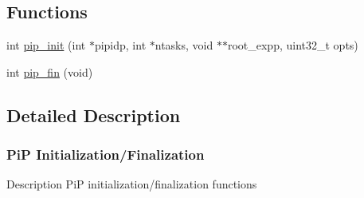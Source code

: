 \documentclass[twoside]{book}
\begin{document}
\subsection*{Functions}
\begin{DoxyCompactItemize}
\item 
int \hyperlink{group__pip-0-init-fin_ga20439326ff318c2dd0752bd544dca0e2}{pip\-\_\-init} (int $\ast$pipidp, int $\ast$ntasks, void $\ast$$\ast$root\-\_\-expp, uint32\-\_\-t opts)
\item 
int \hyperlink{group__pip-0-init-fin_gac4654282785abb9434ce81573fdf16ed}{pip\-\_\-fin} (void)
\end{DoxyCompactItemize}


\subsection{Detailed Description}
\hypertarget{pip-intialize-finalize}{}\subsubsection{Pi\-P Initialization/\-Finalization}\label{pip-intialize-finalize}
\begin{DoxyParagraph}{Description}
Pi\-P initialization/finalization functions 
\end{DoxyParagraph}
\end{document}
